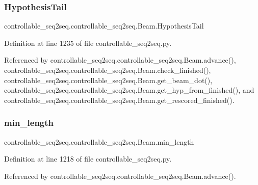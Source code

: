 \subsubsection{\texorpdfstring{Hypothesis\+Tail}{HypothesisTail}}
{\footnotesize\ttfamily controllable\+\_\+seq2seq.\+controllable\+\_\+seq2seq.\+Beam.\+Hypothesis\+Tail}



Definition at line 1235 of file controllable\+\_\+seq2seq.\+py.



Referenced by controllable\+\_\+seq2seq.\+controllable\+\_\+seq2seq.\+Beam.\+advance(), controllable\+\_\+seq2seq.\+controllable\+\_\+seq2seq.\+Beam.\+check\+\_\+finished(), controllable\+\_\+seq2seq.\+controllable\+\_\+seq2seq.\+Beam.\+get\+\_\+beam\+\_\+dot(), controllable\+\_\+seq2seq.\+controllable\+\_\+seq2seq.\+Beam.\+get\+\_\+hyp\+\_\+from\+\_\+finished(), and controllable\+\_\+seq2seq.\+controllable\+\_\+seq2seq.\+Beam.\+get\+\_\+rescored\+\_\+finished().

\mbox{\label{classcontrollable__seq2seq_1_1controllable__seq2seq_1_1Beam_a0e26e14bd1c352f33464fab45ae39675}} 
\subsubsection{\texorpdfstring{min\+\_\+length}{min\_length}}
{\footnotesize\ttfamily controllable\+\_\+seq2seq.\+controllable\+\_\+seq2seq.\+Beam.\+min\+\_\+length}



Definition at line 1218 of file controllable\+\_\+seq2seq.\+py.



Referenced by controllable\+\_\+seq2seq.\+controllable\+\_\+seq2seq.\+Beam.\+advance().

\mbox{\label{classcontrollable__seq2seq_1_1controllable__seq2seq_1_1Beam_aa76753baab725ffa547c5512653f537b}} 
